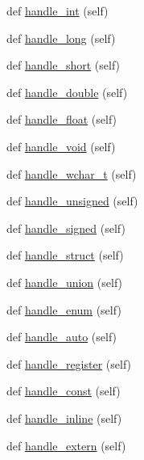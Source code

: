 \begin{DoxyCompactItemize}
def \hyperlink{classcpp_1_1ast_1_1_ast_builder_a6f824335dd53e12a76d6f91ab69c627c}{handle\+\_\+int} (self)
\item 
def \hyperlink{classcpp_1_1ast_1_1_ast_builder_a08f56b25e6bed18aa955f8cad462d2f9}{handle\+\_\+long} (self)
\item 
def \hyperlink{classcpp_1_1ast_1_1_ast_builder_adf11f377386bdb44fe1094ff8adf9142}{handle\+\_\+short} (self)
\item 
def \hyperlink{classcpp_1_1ast_1_1_ast_builder_ad1bd68af800dafcafdfa56e474f9d642}{handle\+\_\+double} (self)
\item 
def \hyperlink{classcpp_1_1ast_1_1_ast_builder_aabe3f6d67124181a8cd2665a4562d4f6}{handle\+\_\+float} (self)
\item 
def \hyperlink{classcpp_1_1ast_1_1_ast_builder_a7a8f94909d4080bad2bc5dabd934057b}{handle\+\_\+void} (self)
\item 
def \hyperlink{classcpp_1_1ast_1_1_ast_builder_a4ec65909aea14f45709733d631aed57b}{handle\+\_\+wchar\+\_\+t} (self)
\item 
def \hyperlink{classcpp_1_1ast_1_1_ast_builder_a793123ea878db159de1662c10bdae897}{handle\+\_\+unsigned} (self)
\item 
def \hyperlink{classcpp_1_1ast_1_1_ast_builder_a61c1e82b2b4fdc337cf360e485851390}{handle\+\_\+signed} (self)
\item 
def \hyperlink{classcpp_1_1ast_1_1_ast_builder_aadfad5b8d50962c04504e806dc0f5b6c}{handle\+\_\+struct} (self)
\item 
def \hyperlink{classcpp_1_1ast_1_1_ast_builder_a9b3fbfb21c6e23f04fd596d590f93eee}{handle\+\_\+union} (self)
\item 
def \hyperlink{classcpp_1_1ast_1_1_ast_builder_a341a6ffabadd444a345c8c98a611774c}{handle\+\_\+enum} (self)
\item 
def \hyperlink{classcpp_1_1ast_1_1_ast_builder_a0cb490894f17a6c34fbe6bb8f7a2e626}{handle\+\_\+auto} (self)
\item 
def \hyperlink{classcpp_1_1ast_1_1_ast_builder_a890e7764fc5fd8ad2da3a62e436278a0}{handle\+\_\+register} (self)
\item 
def \hyperlink{classcpp_1_1ast_1_1_ast_builder_a9d24135000a6fb4a3daabb5ab8883648}{handle\+\_\+const} (self)
\item 
def \hyperlink{classcpp_1_1ast_1_1_ast_builder_ab2eb0c18c07584ef246a46865a17ec40}{handle\+\_\+inline} (self)
\item 
def \hyperlink{classcpp_1_1ast_1_1_ast_builder_a49039750d971240a270606f0608c1ff0}{handle\+\_\+extern} (self)

\end{DoxyCompactItemize}
